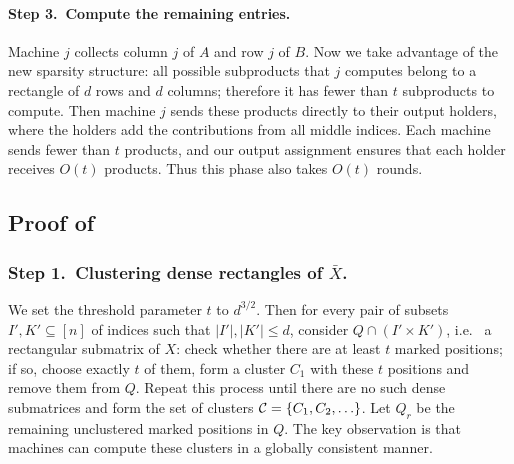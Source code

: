 \paragraph{Step 3.~Compute the remaining entries.}
Machine $j$ collects column $j$ of $A$ and row $j$ of $B$. Now we take advantage of the new sparsity structure: all possible subproducts that $j$ computes belong to a rectangle of $d$ rows and $d$ columns; therefore it has fewer than $t$ subproducts to compute. Then machine $j$ sends these products directly to their output holders, where the holders add the contributions from all middle indices. Each machine sends fewer than $t$ products, and our output assignment ensures
that each holder receives $O(t)$ products. Thus this phase
also takes $O(t)$ rounds.









\subsection{Proof of }


\subsubsection{Step 1.~Clustering dense rectangles of $\bar{X}$.}
We set the threshold parameter $t$ to $d^{3/2}$. Then for every pair of subsets $I',K' \subseteq [n]$ of indices such that $|I'|,|K'| \leq d$, consider $Q\cap(I'\times K')$, i.e.~ a rectangular submatrix of $X$: check whether there are at least $t$ marked positions; if so, choose exactly $t$ of them, form a cluster $C_1$ with these $t$ positions and remove them from $Q$. Repeat this process until there are no such dense submatrices and form the set of clusters $\mathcal{C} =\{C_1,C_2,\ldots \}$. Let $Q_r$ be the remaining unclustered marked positions in $Q$. The key observation is that machines can compute these clusters in a globally consistent manner.

